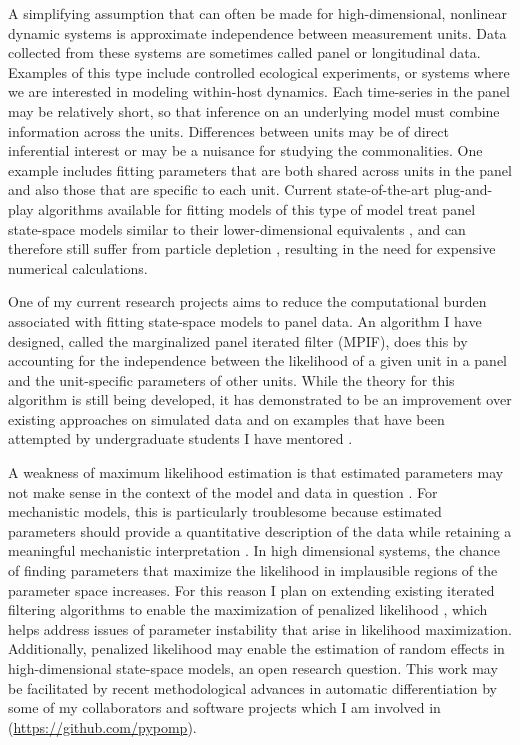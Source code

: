 \documentclass{article}
\begin{document}
A simplifying assumption that can often be made for high-dimensional, nonlinear dynamic systems is approximate independence between measurement units.
Data collected from these systems are sometimes called panel or longitudinal data.
Examples of this type include controlled ecological experiments, or systems where we are interested in modeling within-host dynamics.
Each time-series in the panel may be relatively short, so that inference on an underlying model must combine information across the units.
Differences between units may be of direct inferential interest or may be a nuisance for studying the commonalities.
One example includes fitting parameters that are both shared across units in the panel and also those that are specific to each unit.
Current state-of-the-art plug-and-play algorithms available for fitting models of this type of model treat panel state-space models similar to their lower-dimensional equivalents \cite{breto20}, and can therefore still suffer from particle depletion \cite{snyder08}, resulting in the need for expensive numerical calculations.

One of my current research projects aims to reduce the computational burden associated with fitting state-space models to panel data.
An algorithm I have designed, called the marginalized panel iterated filter (MPIF), does this by accounting for the independence between the likelihood of a given unit in a panel and the unit-specific parameters of other units.
While the theory for this algorithm is still being developed, it has demonstrated to be an improvement over existing approaches on simulated data and on examples that have been attempted by undergraduate students I have mentored \cite{yang23,sun24}.

A weakness of maximum likelihood estimation is that estimated parameters may not make sense in the context of the model and data in question \cite{lecam90}.
For mechanistic models, this is particularly troublesome because estimated parameters should provide a quantitative description of the data while retaining a meaningful mechanistic interpretation \cite{wheeler24}.
In high dimensional systems, the chance of finding parameters that maximize the likelihood in implausible regions of the parameter space increases.
For this reason I plan on extending existing iterated filtering algorithms \cite{ionides15,ionides22} to enable the maximization of penalized likelihood \cite{cole13}, which helps address issues of parameter instability that arise in likelihood maximization.
Additionally, penalized likelihood may enable the estimation of random effects in high-dimensional state-space models, an open research question.
This work may be facilitated by recent methodological advances in automatic differentiation by some of my collaborators \cite{tan24} and software projects which I am involved in (\url{https://github.com/pypomp}).
\end{document}
